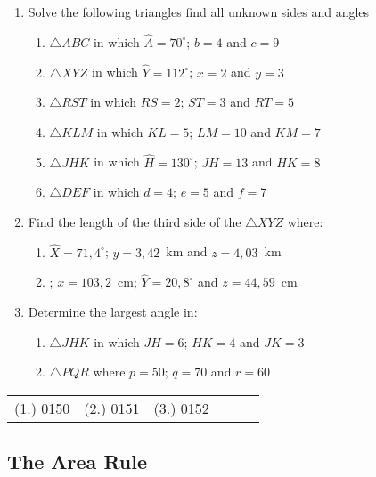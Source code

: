 {
\begin{enumerate}
\item Solve the following triangles \ie find all unknown sides and angles
	\begin{enumerate}
	\item $\triangle ABC$ in which $\hat{A}= 70^\circ$; $b = 4$ and $c = 9$
	\item $\triangle XYZ$ in which $\hat{Y}= 112^\circ$; $x = 2$ and $y = 3$ 
	\item  $\triangle RST$ in which $RS = 2$; $ST = 3$ and $RT = 5$
	\item  $\triangle KLM$ in which $KL = 5$; $LM = 10$ and $KM = 7$
	\item  $\triangle JHK$ in which $\hat{H}= 130^\circ$; $JH = 13$ and $HK = 8$
	\item  $\triangle DEF$ in which $d = 4$; $e =5 $ and $f = 7$
	\end{enumerate}
\item Find the length of the third side of the $\triangle XYZ$ where:
	\begin{enumerate}
	\item $\hat{X}= 71,4^\circ$; $y=3,42$~km and $z=4,03$~km
	\item ; $x=103,2$~cm; $\hat{Y}= 20,8^\circ$ and $z=44,59$~cm
	\end{enumerate}
\item Determine the largest angle in:
	\begin{enumerate}
	\item $\triangle JHK$ in which $JH=6$; $HK=4$ and $JK=3$
	\item $\triangle PQR$ where $p=50$; $q=70$ and $r=60$
	\end{enumerate}
\end{enumerate}


\par \practiceinfo
\par \begin{tabular}[h]{cccccc}
(1.)	0150	&
(2.)	0151	&
(3.)	0152	&
\end{tabular}}

\subsection{The Area Rule}

